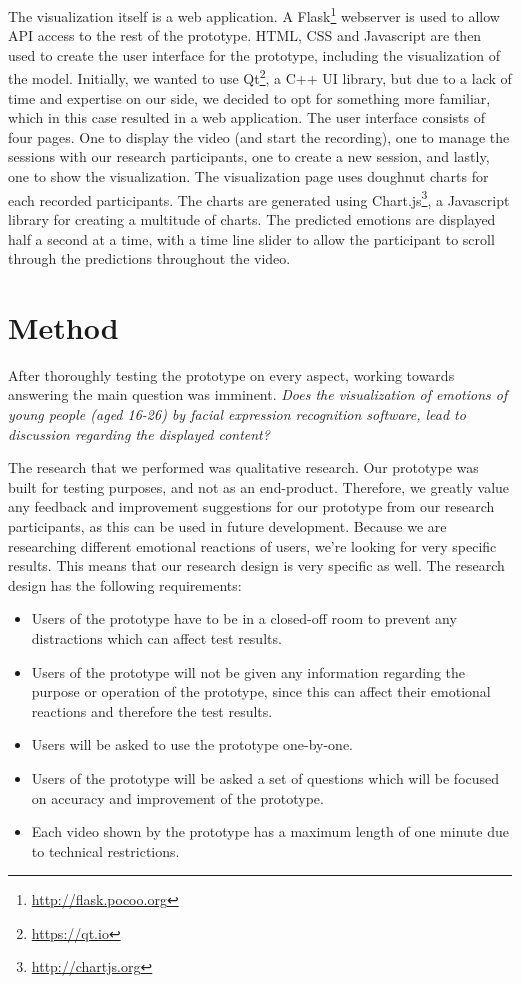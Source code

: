 \documentclass[sigconf]{acmart}
\begin{document}
The visualization itself is a web application. A Flask\footnote{\url{http://flask.pocoo.org}} webserver
is used to allow API access to the rest of the prototype. HTML, CSS and Javascript are then used to
create the user interface for the prototype, including the visualization of the model.
Initially, we wanted to use Qt\footnote{\url{https://qt.io}}, a C++ UI library, but due to a lack of time and
expertise on our side, we decided to opt for something more familiar, which in this case resulted in a web
application. The user interface consists of four pages. One to display the video (and start the recording),
one to manage the sessions with our research participants, one to create a new session, and lastly, one to
show the visualization. The visualization page uses doughnut charts for each recorded participants. The charts
are generated using Chart.js\footnote{\url{http://chartjs.org}}, a Javascript library for creating a multitude
of charts. The predicted emotions are displayed half a second at a time, with a time line slider to allow the
participant to scroll through the predictions throughout the video.


\section{Method} \label{method}
After thoroughly testing the prototype on every aspect, working towards answering the main question was imminent.
\emph{Does the visualization of emotions of young people (aged 16-26) by facial expression
recognition software, lead to discussion regarding the displayed content?}

The research that we performed was qualitative research. Our prototype was built for testing purposes, and not
as an end-product. Therefore, we greatly value any feedback and improvement suggestions for our prototype from
our research participants, as this can be used in future development. Because we are researching
different emotional reactions of users, we're looking for very specific results. This means that our research
design is very specific as well. The research design has the following requirements:
\begin{itemize}
    \item{Users of the prototype have to be in a closed-off room to prevent any distractions which can affect
    test results.}
    \item{Users of the prototype will not be given any information regarding the purpose or operation of the
    prototype, since this can affect their emotional reactions and therefore the test results.}
    \item{Users will be asked to use the prototype one-by-one.}
    \item{Users of the prototype will be asked a set of questions which will be focused on accuracy
    and improvement of the prototype.}
    \item{Each video shown by the prototype has a maximum length of one minute due to technical restrictions.}
\end{itemize}
\end{document}
